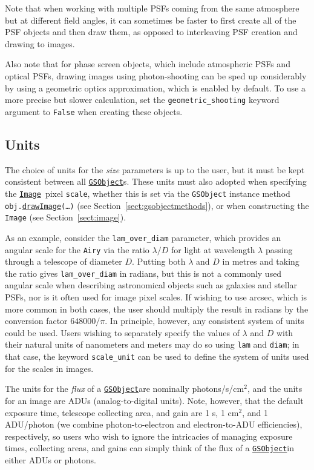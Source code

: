 \documentclass[preprint,10pt]{../../devel/modules/aastex}
\newcommand\GSObject{\href{http://galsim-developers.github.io/GalSim/classgalsim_1_1base_1_1_g_s_object.html}{\texttt{GSObject}}}
\newcommand\drawImage{\href{http://galsim-developers.github.io/GalSim/classgalsim_1_1base_1_1_g_s_object.html\#aafe6ca9d84fe81543fbc105b897273db}{\texttt{drawImage}}}
\newcommand\Image{\href{http://galsim-developers.github.io/GalSim/classgalsim_1_1image_1_1_image.html}{\texttt{Image}}}
\begin{document}
Note that when working with multiple PSFs coming from the same atmosphere but at different field
angles, it can sometimes be faster to first create all of the PSF objects and then draw them, as
opposed to interleaving PSF creation and drawing to images.

Also note that for phase screen objects, which include atmospheric PSFs and optical PSFs,
drawing images using photon-shooting can be sped up considerably by using a geometric optics
approximation, which is enabled by default.  To use a more precise but slower calculation, set
the \texttt{geometric\_shooting} keyword argument to \texttt{False} when creating these objects.

\subsection{Units}
The choice of units for the \textit{size} parameters is up to the user,
but it must be kept consistent between all \GSObject s.  These
units must also adopted when specifying the \Image\ pixel
\texttt{scale}, whether this is set via the \texttt{GSObject}
instance method \texttt{obj.}\drawImage\texttt{(\dots)}
(see Section~\ref{sect:gsobjectmethods}),
or when constructing the \texttt{Image} (see Section~\ref{sect:image}).

As an example, consider the
\texttt{lam\_over\_diam} parameter, which provides an angular scale for
the \texttt{Airy} via
the ratio $\lambda / D$ for light at wavelength $\lambda$ passing
through a telescope of diameter $D$. Putting both $\lambda$ and
$D$ in metres and taking the ratio gives \texttt{lam\_over\_diam} in
radians, but this is not a commonly used angular scale when describing
astronomical objects such as galaxies and stellar PSFs, nor is
it often used for image pixel scales.  If wishing to use arcsec, which
is more common in both cases, the user should multiply the result in
radians by the conversion factor
$648000 / \pi$.  In principle, however, any consistent
system of units could be used.  Users wishing to separately specify the values of $\lambda$ and $D$
with their natural units of nanometers and meters may do so using \texttt{lam} and \texttt{diam}; in
that case, the keyword \texttt{scale\_unit} can be used to define the system of units used for the
scales in images.

The units for the \textit{flux} of a \GSObject are nominally photons/s/cm$^2$, and the units for an
image are ADUs (analog-to-digital units).  Note, however, that the default exposure time, telescope
collecting area, and gain are 1 s, 1 cm$^2$, and 1 ADU/photon (we combine photon-to-electron and
electron-to-ADU efficiencies), respectively, so users who wish to ignore the intricacies of managing
exposure times, collecting areas, and gains can simply think of the flux of a \GSObject in either
ADUs or photons.
\end{document}
